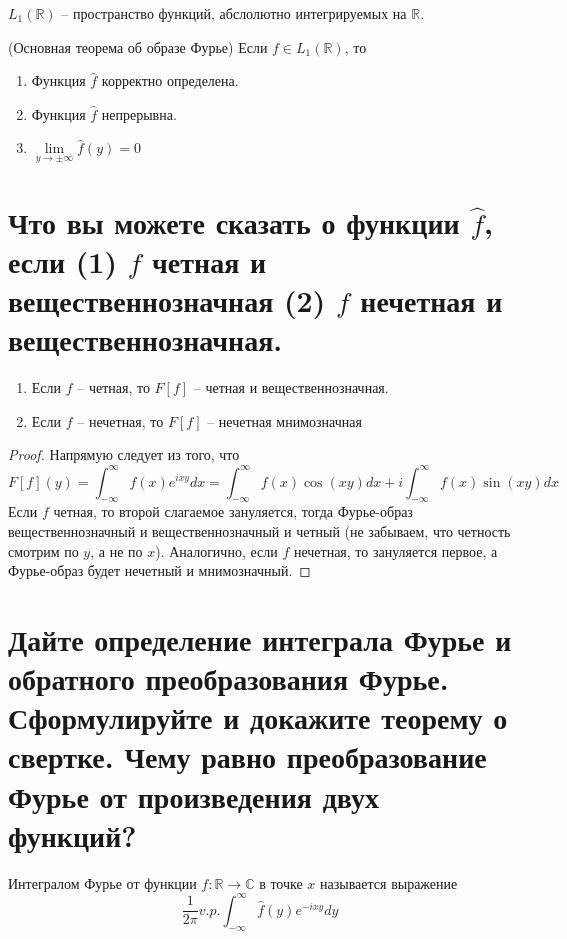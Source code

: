 \begin{definition}
    $L_1(\mathbb{R})$ -- пространство функций, абслолютно интегрируемых на $\mathbb{R}$.
\end{definition}

\begin{theorem} (Основная теорема об образе Фурье)
    Если $f\in L_1(\mathbb{R})$, то
    \begin{enumerate}
        \item Функция $\hat{f}$ корректно определена.
        \item Функция $\hat{f}$ непрерывна.
        \item $\lim\limits_{y\to\pm\infty}\hat{f}(y) = 0$
    \end{enumerate}
\end{theorem}

\section{Что вы можете сказать о функции $\hat{f}$, если (1) $f$ четная и вещественнозначная (2) $f$ нечетная и вещественнозначная.}
\begin{lemma}
    \begin{enumerate}
        \item Если $f$ -- четная, то $F[f]$ -- четная и вещественнозначная.
        \item Если $f$ -- нечетная, то $F[f]$ -- нечетная мнимозначная
    \end{enumerate}
\end{lemma}

\begin{proof}
    Напрямую следует из того, что
    $$
    F[f](y) = \int_{-\infty}^{\infty}f(x)e^{ixy}dx
    =
    \int_{-\infty}^{\infty}f(x)\cos(xy)dx + i\int_{-\infty}^{\infty}f(x)\sin(xy)dx
    $$
    Если $f$ четная, то второй слагаемое зануляется, тогда Фурье-образ вещественнозначный и вещественнозначный и четный (не забываем, что четность смотрим по $y$, а не по $x$). Аналогично, если $f$ нечетная, то зануляется первое, а Фурье-образ будет нечетный и мнимозначный.
\end{proof}

\section{Дайте определение интеграла Фурье и обратного преобразования Фурье. Сформулируйте и докажите теорему о свертке. Чему равно преобразование Фурье от произведения двух функций?}
\begin{definition}
    Интегралом Фурье от функции $f\colon \mathbb{R}\to\mathbb{C}$ в точке $x$ называется выражение $$\frac{1}{2\pi} v.p.\int_{-\infty}^{\infty}\hat{f}(y)e^{-ixy}dy$$
\end{definition}

